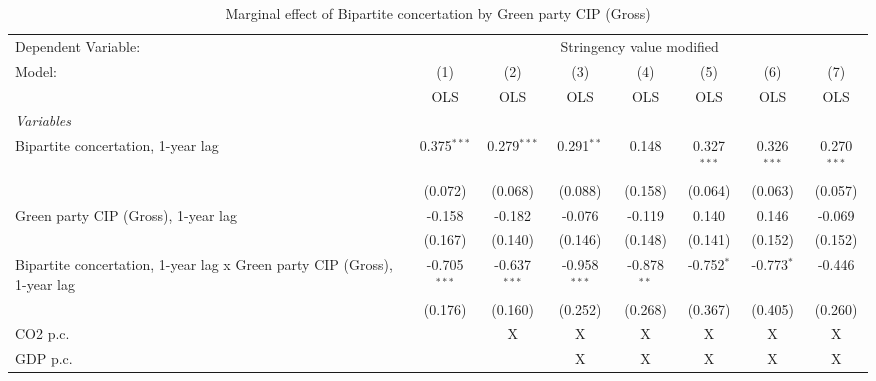 
\begin{table}[htbp]
   \caption{Marginal effect of Bipartite concertation by Green party CIP (Gross)}
   \centering
   \begin{tabular}{lccccccc}
      \toprule
      Dependent Variable: & \multicolumn{7}{c}{Stringency value modified}\\
      Model:                                                                   & (1)            & (2)            & (3)            & (4)           & (5)           & (6)           & (7)\\  
                                                                               &  OLS           & OLS            & OLS            & OLS           & OLS           & OLS           & OLS\\  
      \midrule
      \emph{Variables}\\
      Bipartite concertation, 1-year lag                                       & 0.375$^{***}$  & 0.279$^{***}$  & 0.291$^{**}$   & 0.148         & 0.327$^{***}$ & 0.326$^{***}$ & 0.270$^{***}$\\   
                                                                               & (0.072)        & (0.068)        & (0.088)        & (0.158)       & (0.064)       & (0.063)       & (0.057)\\   
      Green party CIP (Gross), 1-year lag                                      & -0.158         & -0.182         & -0.076         & -0.119        & 0.140         & 0.146         & -0.069\\   
                                                                               & (0.167)        & (0.140)        & (0.146)        & (0.148)       & (0.141)       & (0.152)       & (0.152)\\   
      Bipartite concertation, 1-year lag x Green party CIP (Gross), 1-year lag & -0.705$^{***}$ & -0.637$^{***}$ & -0.958$^{***}$ & -0.878$^{**}$ & -0.752$^{*}$  & -0.773$^{*}$  & -0.446\\   
                                                                               & (0.176)        & (0.160)        & (0.252)        & (0.268)       & (0.367)       & (0.405)       & (0.260)\\   
      CO2 p.c.                                                                 &                & X              & X              & X             & X             & X             & X\\  
      GDP p.c.                                                                 &                &                & X              & X             & X             & X             & X\\  

\end{tabular}
\end{table}
